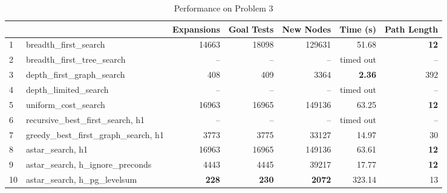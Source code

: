 \documentclass{article}
\theoremstyle{plain}
\theoremstyle{definition}
\theoremstyle{remark}
\begin{document}
\begin{table}[h]
\bigskip
\bigskip

\caption{Performance on Problem 3}
\label{table-performance 3}
\begin{tabular}{ll|rrrrr}
   &                                        & \multicolumn{1}{l}{Expansions} & \multicolumn{1}{l}{Goal Tests} & \multicolumn{1}{l}{New Nodes} & \multicolumn{1}{l}{Time (s)} & \multicolumn{1}{l}{Path Length} \\ \hline
1  & breadth\_first\_search                 & 14663                          & 18098                          & 129631                        & 51.68                        & \textbf{12}                     \\
2  & breadth\_first\_tree\_search           & --                             & --                             & --                            & timed out                    & --                              \\
3  & depth\_first\_graph\_search            & 408                            & 409                            & 3364                          & \textbf{2.36}                & 392                             \\
4  & depth\_limited\_search                 & --                             & --                             & --                            & timed out                    & --                              \\
5  & uniform\_cost\_search                  & 16963                          & 16965                          & 149136                        & 63.25                        & \textbf{12}                     \\
6  & recursive\_best\_first\_search, h1     & --                             & --                             & --                            & timed out                    & --                              \\
7  & greedy\_best\_first\_graph\_search, h1 & 3773                           & 3775                           & 33127                         & 14.97                        & 30                              \\
8  & astar\_search, h1                      & 16963                          & 16965                          & 149136                        & 63.61                        & \textbf{12}                     \\
9  & astar\_search, h\_ignore\_preconds     & 4443                           & 4445                           & 39217                         & 17.77                        & \textbf{12}                     \\
10 & astar\_search, h\_pg\_levelsum         & \textbf{228}                   & \textbf{230}                   & \textbf{2072}                 & 323.14                       & 13                             
\end{tabular}
\end{table}
\end{document}
